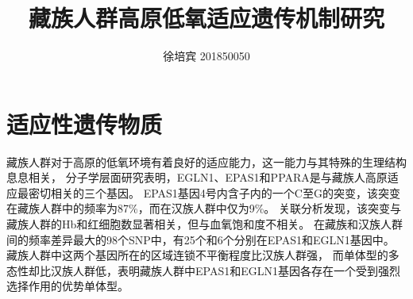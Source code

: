 \documentclass[UTF8]{article}
\title{藏族人群高原低氧适应遗传机制研究}
\author{徐培宾 201850050}
\begin{document}
    \maketitle
    \section{适应性遗传物质}
    藏族人群对于高原的低氧环境有着良好的适应能力，这一能力与其特殊的生理结构息息相关，
    分子学层面研究表明，EGLN1、EPAS1和PPARA是与藏族人高原适应最密切相关的三个基因。
    EPAS1基因4号内含子内的一个C至G的突变，该突变在藏族人群中的频率为87\%，而在汉族人群中仅为9\%。
    关联分析发现，该突变与藏族人群的Hb和红细胞数显著相关，但与血氧饱和度不相关。
    在藏族和汉族人群间的频率差异最大的98个SNP中，有25个和6个分别在EPAS1和EGLN1基因中。
    藏族人群中这两个基因所在的区域连锁不平衡程度比汉族人群强，
    而单体型的多态性却比汉族人群低，表明藏族人群中EPAS1和EGLN1基因各存在一个受到强烈选择作用的优势单体型。


\end{document}
